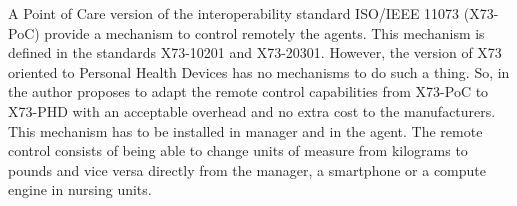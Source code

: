 A Point of Care version of the interoperability standard ISO/IEEE 11073 (X73-PoC) provide a mechanism to control remotely the agents. This mechanism is defined in the standards X73-10201 and X73-20301. However, the version of X73 oriented to Personal Health Devices has no mechanisms to do such a thing. So, in \cite{b14} the author proposes to adapt the remote control capabilities from X73-PoC to X73-PHD with an acceptable overhead and no extra cost to the manufacturers. This mechanism has to be installed in manager and in the agent. The remote control consists of being able to change units of measure from kilograms to pounds and vice versa directly from the manager, a smartphone or a compute engine
in nursing units.
